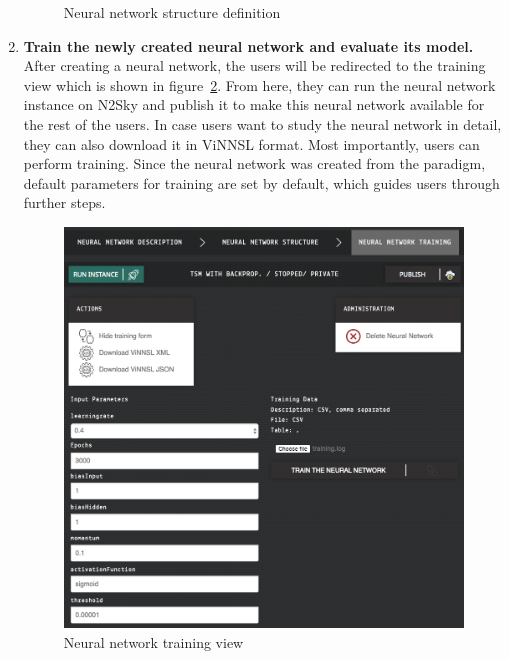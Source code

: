 \documentclass[conference]{IEEEtran}
\begin{document}
\begin{enumerate}
\begin{figure}[H]
  \caption{Neural network structure definition}
  \label{fig:structure}
\end{figure}
\item \textbf{Train the newly created neural network and evaluate its model.} After creating a neural network, the users will be redirected to the training view which is shown in figure~\ref{fig:training}. From here, they can run the neural network instance on N2Sky and publish it to make this neural network available for the rest of the users. In case users want to study the neural network in detail, they can also download it in ViNNSL format. Most importantly, users can perform training. Since the neural network was created from the paradigm, default parameters for training are set by default, which guides users through further steps.

\begin{figure}[H]
  \includegraphics[width=\linewidth]{training.png}
  \caption{Neural network training view}
  \label{fig:training}
\end{figure}






\end{enumerate}
\end{document}
